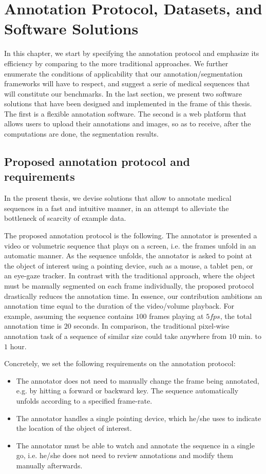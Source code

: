 \chapter{Annotation Protocol, Datasets, and Software Solutions}
\label{datasets}


In this chapter, we start by specifying the annotation protocol and emphasize its efficiency by comparing to the more traditional approaches.
We further enumerate the conditions of applicability that our annotation/segmentation frameworks will have to respect, and suggest a serie of medical sequences that will constitute our benchmarks.
In the last section, we present two software solutions that have been designed and implemented in the frame of this thesis.
The first is a flexible annotation software.
The second is a web platform that allows users to upload their annotations and images, so as to receive, after the computations are done, the segmentation results.

\section{Proposed annotation protocol and requirements}

In the present thesis, we devise solutions that allow to annotate medical sequences in a fast and intuitive manner, in an attempt to alleviate the bottleneck of scarcity of example data.

The proposed annotation protocol is the following.
The annotator is presented a video or volumetric sequence that plays on a screen, i.e. the frames unfold in an automatic manner.
As the sequence unfolds, the annotator is asked to point at the object of interest using a pointing device, such as a mouse, a tablet pen, or an eye-gaze tracker.
In contrast with the traditional approach, where the object must be manually segmented on each frame individually, the proposed protocol drastically reduces the annotation time.
In essence, our contribution ambitions an annotation time equal to the duration of the video/volume playback.
For example, assuming the sequence contains $100$ frames playing at $5fps$, the total annotation time is $20$ seconds.
In comparison, the traditional pixel-wise annotation task of a sequence of similar size could take anywhere from $10$ min. to $1$ hour.

Concretely, we set the following requirements on the annotation protocol:
\begin{itemize}
  \item The annotator does not need to manually change the frame being annotated, e.g. by hitting a forward or backward key. The sequence automatically unfolds according to a specified frame-rate.
  \item The annotator handles a single pointing device, which he/she uses to indicate the location of the object of interest.
  \item The annotator must be able to watch and annotate the sequence in a single go, i.e. he/she does not need to review annotations and modify them manually afterwards.
\end{itemize}

